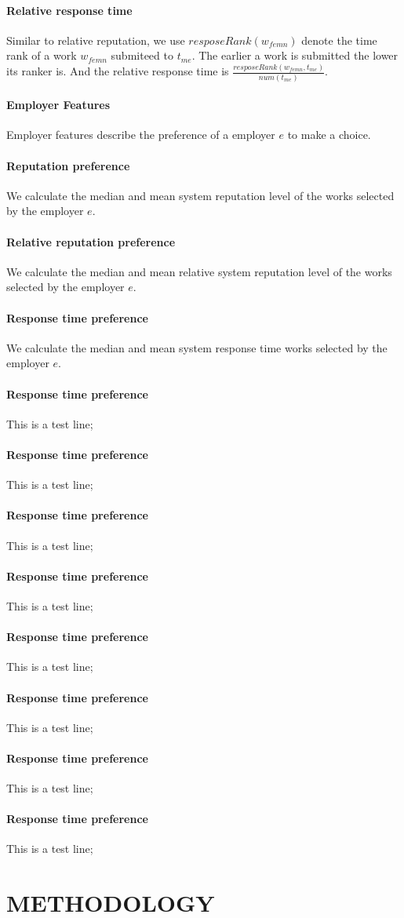 \documentclass{article}
\begin{document}
\paragraph{Relative response time} Similar to relative reputation, we use $resposeRank({w}_{femn})$ denote the time rank of a work ${w}_{femn}$ submiteed to ${t}_{me}$. The earlier a work is submitted the lower its ranker is. And the relative response time is $\frac{resposeRank({w}_{femn}, {t}_{me})}{num({t}_{me})}$.
\paragraph{Employer Features} Employer features describe the preference of a employer $e$ to make a choice.
\paragraph{Reputation preference} We calculate the median and mean system reputation level of the works selected by the employer $e$.
\paragraph{Relative reputation preference}We calculate the median and mean relative system reputation level of the works selected by the employer $e$.
\paragraph{Response time preference}We calculate the median and mean system response time works selected by the employer $e$.
\paragraph{Response time preference}This is a test line;
\paragraph{Response time preference}This is a test line;
\paragraph{Response time preference}This is a test line;
\paragraph{Response time preference}This is a test line;
\paragraph{Response time preference}This is a test line;
\paragraph{Response time preference}This is a test line;
\paragraph{Response time preference}This is a test line;
\paragraph{Response time preference}This is a test line;

\section{METHODOLOGY}
\end{document}
